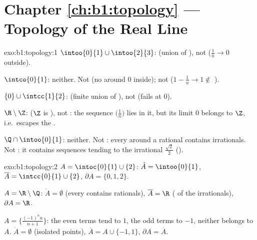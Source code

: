 \section*{Chapter \ref{ch:b1:topology} --- Topology of the Real Line}

\begin{solution}{exo:b1:topology:1}
$\intoo{0}{1} \cup \intoo{2}{3}$:  (union of ), not
 ($\frac 1n \to 0$ outside).

$\intco{0}{1}$: neither. Not  (no  around $0$ inside);
not  ($1 - \frac1n \to 1 \notin$ ).

$\{0\} \cup \intcc{1}{2}$:  (finite union of ), not
 (fails at $0$).

$\R \setminus \Z$:  ($\Z$ is ), not : the sequence
$\bigl(\frac 1n\bigr)$ lies in it, but its limit $0$ belongs to $\Z$,
i.e.\ escapes the .

$\Q \cap \intoo{0}{1}$: neither. Not : every  around a
rational contains irrationals. Not : it contains sequences
tending to the irrational $\frac{\sqrt 2}{2}$ ().
\end{solution}

\begin{solution}{exo:b1:topology:2}
$A = \intoc{0}{1} \cup \{2\}$: $\mathring A = \intoo{0}{1}$,
$\overline A = \intcc{0}{1} \cup \{2\}$, $\partial A = \{0, 1, 2\}$.

$A = \R \setminus \Q$: $\mathring A = \emptyset$ (every 
contains rationals), $\overline A = \R$ ( of the
irrationals), $\partial A = \R$.

$A = \bigl\{\frac{(-1)^n n}{n+1}\bigr\}$: the even terms tend to $1$,
the odd terms to $-1$, neither belongs to $A$. $\mathring A =
\emptyset$ (isolated points), $\overline A = A \cup \{-1, 1\}$,
$\partial A = \overline A$.
\end{solution}

